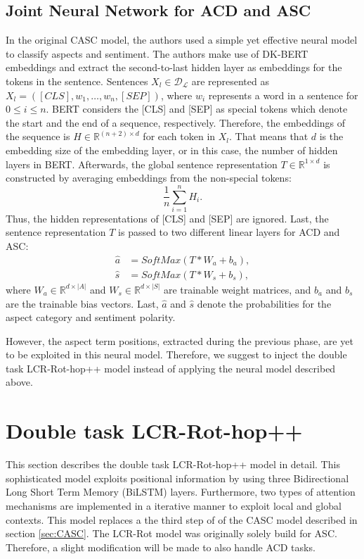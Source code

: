 \documentclass[american, oneside]{ecsgdp}
\begin{document}
\subsection{Joint Neural Network for ACD and ASC} %
In the original CASC model, the authors used a simple yet effective neural model to classify aspects and sentiment. The authors make use of DK-BERT embeddings and extract the second-to-last hidden layer as embeddings for the tokens in the sentence. Sentences $X_l \in \mathcal{D_\mathcal{L}}$ are represented as $X_l = \left ( [CLS], w_1, \ldots, w_n, [SEP] \right )$, where $w_i$ represents a word in a sentence for $0 \leq i \leq n$. BERT considers the [CLS] and [SEP] as special tokens which denote the start and the end of a sequence, respectively. Therefore, the embeddings of the sequence is $H \in \mathbb{R}^{(n+2) \times d}$ for each token in $X_l$. That means that $d$ is the embedding size of the embedding layer, or in this case, the number of hidden layers in BERT. Afterwards, the global sentence representation $T \in \mathbb{R}^{1 \times d}$ is constructed by averaging embeddings from the non-special tokens: 
\begin{equation} 
    \frac{1}{n} \sum_{i=1}^{n}H_i. 
\end{equation}
Thus, the hidden representations of [CLS] and [SEP] are ignored. Last, the sentence representation $T$ is passed to two different linear layers for ACD and ASC: 
\begin{align}
    \hat{a} & = SoftMax(T * W_a + b_a), \\
    \hat{s} & = SoftMax(T * W_s + b_s),
\end{align}
where $W_a \in \mathbb{R}^{d \times \lvert A \rvert}$ and $W_s \in \mathbb{R}^{d \times \lvert S \rvert}$ are trainable weight matrices, and $b_a$ and $b_s$ are the trainable bias vectors. Last, $\hat{a}$ and  $\hat{s}$ denote the probabilities for the aspect category and sentiment polarity.

However, the aspect term positions, extracted during the previous phase, are yet to be exploited in this neural model. Therefore, we suggest to inject the double task LCR-Rot-hop++ model instead of applying the neural model described above. 

\section{Double task LCR-Rot-hop++} \label{sec:LCR-Rot}
This section describes the double task LCR-Rot-hop++ model \parencite{Trusca2020HAABSA++} in detail. This sophisticated model exploits positional information by using three Bidirectional Long Short Term Memory (BiLSTM) layers. Furthermore, two types of attention mechanisms are implemented in a iterative manner to exploit local and global contexts. This model replaces a the third step of of the CASC model described in section \cref{sec:CASC}. The LCR-Rot model was originally solely build for ASC. Therefore, a slight modification will be made to also handle ACD tasks.
\end{document}
